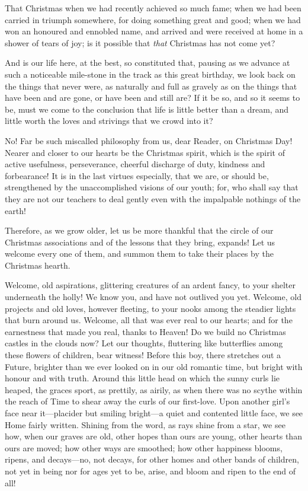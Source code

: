 That Christmas when we had recently achieved so much fame; when we
had been carried in triumph somewhere, for doing something great and
good; when we had won an honoured and ennobled name, and arrived and
were received at home in a shower of tears of joy; is it possible
that \emph{that} Christmas has not come yet?

And is our life here, at the best, so constituted that, pausing as
we advance at such a noticeable mile-stone in the track as this
great birthday, we look back on the things that never were, as
naturally and full as gravely as on the things that have been and
are gone, or have been and still are?  If it be so, and so it seems
to be, must we come to the conclusion that life is little better
than a dream, and little worth the loves and strivings that we crowd
into it?

No!  Far be such miscalled philosophy from us, dear Reader, on
Christmas Day!  Nearer and closer to our hearts be the Christmas
spirit, which is the spirit of active usefulness, perseverance,
cheerful discharge of duty, kindness and forbearance!  It is in the
last virtues especially, that we are, or should be, strengthened by
the unaccomplished visions of our youth; for, who shall say that
they are not our teachers to deal gently even with the impalpable
nothings of the earth!

Therefore, as we grow older, let us be more thankful that the circle
of our Christmas associations and of the lessons that they bring,
expands!  Let us welcome every one of them, and summon them to take
their places by the Christmas hearth.

Welcome, old aspirations, glittering creatures of an ardent fancy,
to your shelter underneath the holly!  We know you, and have not
outlived you yet.  Welcome, old projects and old loves, however
fleeting, to your nooks among the steadier lights that burn around
us.  Welcome, all that was ever real to our hearts; and for the
earnestness that made you real, thanks to Heaven!  Do we build no
Christmas castles in the clouds now?  Let our thoughts, fluttering
like butterflies among these flowers of children, bear witness!
Before this boy, there stretches out a Future, brighter than we ever
looked on in our old romantic time, but bright with honour and with
truth.  Around this little head on which the sunny curls lie heaped,
the graces sport, as prettily, as airily, as when there was no
scythe within the reach of Time to shear away the curls of our
first-love.  Upon another girl's face near it---placider but smiling
bright---a quiet and contented little face, we see Home fairly
written.  Shining from the word, as rays shine from a star, we see
how, when our graves are old, other hopes than ours are young, other
hearts than ours are moved; how other ways are smoothed; how other
happiness blooms, ripens, and decays---no, not decays, for other
homes and other bands of children, not yet in being nor for ages yet
to be, arise, and bloom and ripen to the end of all!

